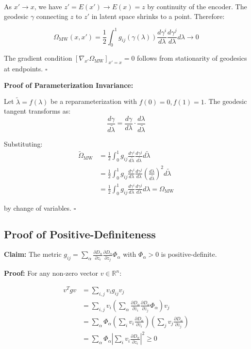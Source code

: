 \documentclass[11pt,a4paper]{article}
\begin{document}
As $x' \to x$, we have $z' = E(x') \to E(x) = z$ by continuity of the encoder. The geodesic $\gamma$ connecting $z$ to $z'$ in latent space shrinks to a point. Therefore:

\begin{equation}
\Omega_{\text{MW}}(x,x') = \frac{1}{2}\int_0^1 g_{ij}(\gamma(\lambda))\frac{d\gamma^i}{d\lambda}\frac{d\gamma^j}{d\lambda}d\lambda \to 0
\end{equation}

The gradient condition $[\nabla_{x'}\Omega_{\text{MW}}]_{x'=x} = 0$ follows from stationarity of geodesics at endpoints. $\square$

\textbf{Proof of Parameterization Invariance:}

Let $\tilde{\lambda} = f(\lambda)$ be a reparameterization with $f(0)=0, f(1)=1$. The geodesic tangent transforms as:
\begin{equation}
\frac{d\gamma}{d\tilde{\lambda}} = \frac{d\gamma}{d\lambda} \cdot \frac{d\lambda}{d\tilde{\lambda}}
\end{equation}

Substituting:
\begin{align}
\tilde{\Omega}_{\text{MW}} &= \frac{1}{2}\int_0^1 g_{ij}\frac{d\gamma^i}{d\tilde{\lambda}}\frac{d\gamma^j}{d\tilde{\lambda}} d\tilde{\lambda} \\
&= \frac{1}{2}\int_0^1 g_{ij}\frac{d\gamma^i}{d\lambda}\frac{d\gamma^j}{d\lambda} \left(\frac{d\lambda}{d\tilde{\lambda}}\right)^2 d\tilde{\lambda} \\
&= \frac{1}{2}\int_0^1 g_{ij}\frac{d\gamma^i}{d\lambda}\frac{d\gamma^j}{d\lambda} d\lambda = \Omega_{\text{MW}}
\end{align}

by change of variables. $\square$

\subsection{Proof of Positive-Definiteness}

\textbf{Claim:} The metric $g_{ij} = \sum_\alpha \frac{\partial D_\alpha}{\partial z_i}\frac{\partial D_\alpha}{\partial z_j}\Phi_\alpha$ with $\Phi_\alpha > 0$ is positive-definite.

\textbf{Proof:} For any non-zero vector $v \in \mathbb{R}^n$:

\begin{align}
v^T g v &= \sum_{i,j} v_i g_{ij} v_j \\
&= \sum_{i,j} v_i \left(\sum_\alpha \frac{\partial D_\alpha}{\partial z_i}\frac{\partial D_\alpha}{\partial z_j}\Phi_\alpha\right) v_j \\
&= \sum_\alpha \Phi_\alpha \left(\sum_i v_i \frac{\partial D_\alpha}{\partial z_i}\right)\left(\sum_j v_j \frac{\partial D_\alpha}{\partial z_j}\right) \\
&= \sum_\alpha \Phi_\alpha \left|\sum_i v_i \frac{\partial D_\alpha}{\partial z_i}\right|^2 \geq 0
\end{align}
\end{document}
